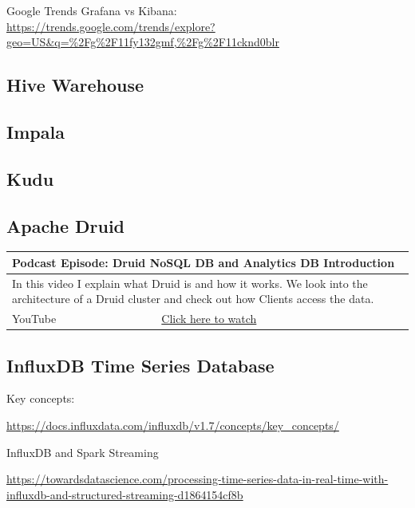 \documentclass[12pt, numbers=noenddot]{scrreprt} %
\begin{document}
Google Trends Grafana vs Kibana: \\
\url{https://trends.google.com/trends/explore?geo=US&q=%2Fg%2F11fy132gmf,%2Fg%2F11cknd0blr}



\subsection{Hive Warehouse}
\subsection{Impala}
\subsection{Kudu}
\subsection{Apache Druid}

\begin{table}[h]
\begin{tabular}{ll}
\hline
\multicolumn{2}{l}{\textbf{Podcast Episode:} Druid NoSQL DB and Analytics DB Introduction} \\ \hline
\multicolumn{2}{p{15cm}}{In this video I explain what Druid is and how it works.
We look into the architecture of a Druid cluster and check out how Clients access the data.}         \\ \hline
\multicolumn{1}{l|}{YouTube}   & \href{https://youtu.be/EiEIeBXSWjM}{Click here to watch}   \\  \hline
\end{tabular}
\end{table}




\subsection{InfluxDB Time Series Database}

Key concepts:

\url{https://docs.influxdata.com/influxdb/v1.7/concepts/key_concepts/}

InfluxDB and Spark Streaming

\url{https://towardsdatascience.com/processing-time-series-data-in-real-time-with-influxdb-and-structured-streaming-d1864154cf8b}
\end{document}
